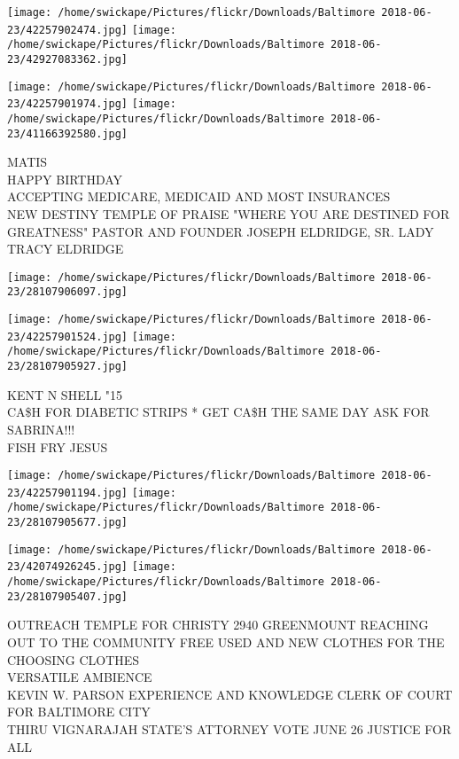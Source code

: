 \documentclass[10pt,letterpaper]{article}
\begin{document}
\texttt{[image: /home/swickape/Pictures/flickr/Downloads/Baltimore 2018-06-23/42257902474.jpg]}
\texttt{[image: /home/swickape/Pictures/flickr/Downloads/Baltimore 2018-06-23/42927083362.jpg]}

\texttt{[image: /home/swickape/Pictures/flickr/Downloads/Baltimore 2018-06-23/42257901974.jpg]}
\texttt{[image: /home/swickape/Pictures/flickr/Downloads/Baltimore 2018-06-23/41166392580.jpg]}

MATIS\\
HAPPY BIRTHDAY\\
ACCEPTING MEDICARE, MEDICAID AND MOST INSURANCES\\
NEW DESTINY TEMPLE OF PRAISE "WHERE YOU ARE DESTINED FOR GREATNESS"  PASTOR AND FOUNDER JOSEPH ELDRIDGE, SR.  LADY TRACY ELDRIDGE\\
\pagebreak

\texttt{[image: /home/swickape/Pictures/flickr/Downloads/Baltimore 2018-06-23/28107906097.jpg]}

\vspace{0.25in}
\texttt{[image: /home/swickape/Pictures/flickr/Downloads/Baltimore 2018-06-23/42257901524.jpg]}
\texttt{[image: /home/swickape/Pictures/flickr/Downloads/Baltimore 2018-06-23/28107905927.jpg]}

KENT N SHELL "15\\
CA\$H FOR DIABETIC STRIPS * GET CA\$H THE SAME DAY ASK FOR SABRINA!!!\\
FISH FRY JESUS\\
\pagebreak

\texttt{[image: /home/swickape/Pictures/flickr/Downloads/Baltimore 2018-06-23/42257901194.jpg]}
\texttt{[image: /home/swickape/Pictures/flickr/Downloads/Baltimore 2018-06-23/28107905677.jpg]}

\texttt{[image: /home/swickape/Pictures/flickr/Downloads/Baltimore 2018-06-23/42074926245.jpg]}
\texttt{[image: /home/swickape/Pictures/flickr/Downloads/Baltimore 2018-06-23/28107905407.jpg]}

OUTREACH TEMPLE FOR CHRISTY 2940 GREENMOUNT REACHING OUT TO THE COMMUNITY FREE USED AND NEW CLOTHES FOR THE CHOOSING CLOTHES\\
VERSATILE AMBIENCE\\
KEVIN W. PARSON EXPERIENCE AND KNOWLEDGE CLERK OF COURT FOR BALTIMORE CITY\\
THIRU VIGNARAJAH STATE'S ATTORNEY VOTE JUNE 26 JUSTICE FOR ALL\\
\pagebreak
\end{document}
